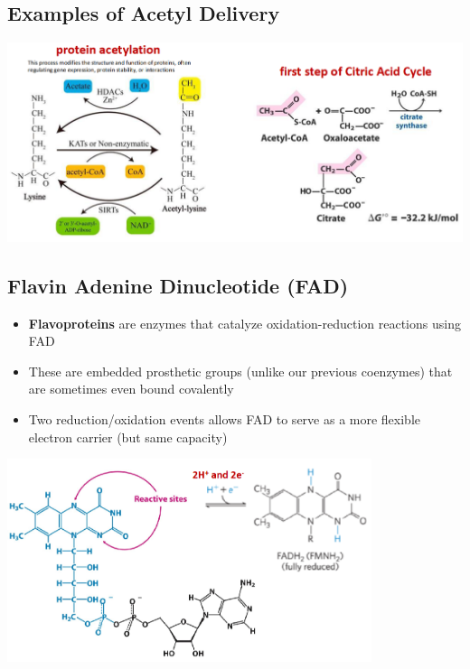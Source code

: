 \documentclass[10pt]{article}
\begin{document}
\subsection*{Examples of Acetyl Delivery}
\begin{center} 
	\includegraphics*[width=\textwidth]{L2_16.png}
\end{center}

\pagebreak
\subsection*{Flavin Adenine Dinucleotide (FAD)}
\begin{itemize}
	\item \textbf{Flavoproteins} are enzymes that catalyze oxidation-reduction reactions using FAD
	\item These are embedded prosthetic groups (unlike our previous coenzymes) that are sometimes even bound covalently
	\item Two reduction/oxidation events allows FAD to serve as a more flexible electron carrier (but same capacity)
\end{itemize}
\begin{center} 
	\includegraphics*[width=0.8\textwidth]{L2_17.png}
\end{center}
\end{document}
